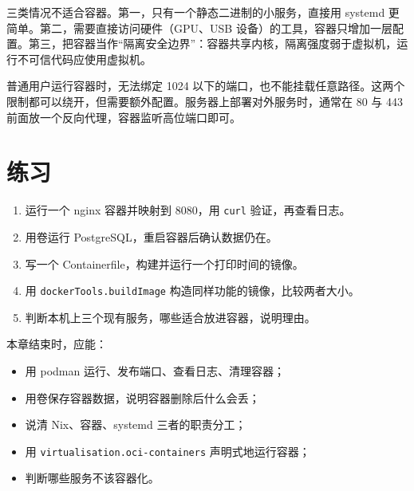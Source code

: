 三类情况不适合容器。第一，只有一个静态二进制的小服务，直接用 systemd 更简单。第二，需要直接访问硬件（GPU、USB 设备）的工具，容器只增加一层配置。第三，把容器当作“隔离安全边界”：容器共享内核，隔离强度弱于虚拟机，运行不可信代码应使用虚拟机。

\begin{notebox}
普通用户运行容器时，无法绑定 1024 以下的端口，也不能挂载任意路径。这两个限制都可以绕开，但需要额外配置。服务器上部署对外服务时，通常在 80 与 443 前面放一个反向代理，容器监听高位端口即可。
\end{notebox}

\section{练习}

\begin{enumerate}
  \item 运行一个 nginx 容器并映射到 8080，用 \texttt{curl} 验证，再查看日志。
  \item 用卷运行 PostgreSQL，重启容器后确认数据仍在。
  \item 写一个 Containerfile，构建并运行一个打印时间的镜像。
  \item 用 \texttt{dockerTools.\allowbreak{}buildImage} 构造同样功能的镜像，比较两者大小。
  \item 判断本机上三个现有服务，哪些适合放进容器，说明理由。
\end{enumerate}

\begin{checkpoint}
本章结束时，应能：
\begin{itemize}
  \item 用 podman 运行、发布端口、查看日志、清理容器；
  \item 用卷保存容器数据，说明容器删除后什么会丢；
  \item 说清 Nix、容器、systemd 三者的职责分工；
  \item 用 \texttt{virtualisation.oci-containers} 声明式地运行容器；
  \item 判断哪些服务不该容器化。
\end{itemize}
\end{checkpoint}
